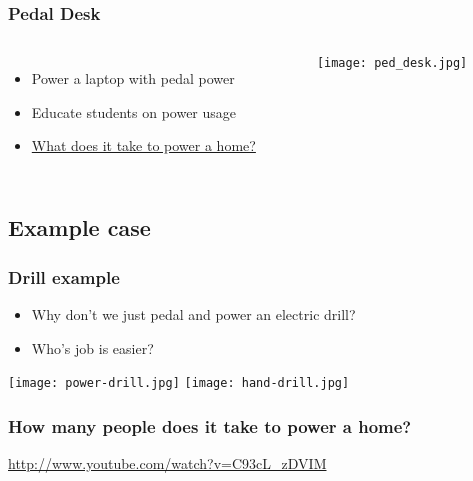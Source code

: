 \documentclass[]{beamer}
\begin{document}
\frame
{
    \frametitle{Pedal Desk}
    \begin{columns}[t]
        \column{6cm}
        \begin{itemize}
            \item Power a laptop with pedal power
            \item Educate students on power usage
            \item \href{http://news.bbc.co.uk/2/hi/science/nature/8394055.stm}{What does it take to power a home?}
        \end{itemize}
        \column{5cm}
        \begin{center}
        \begin{figure}[]
            \texttt{[image: ped\_desk.jpg]}
        \end{figure}
        \end{center}
    \end{columns}
}
\subsection{Example case}
\frame
{
    \frametitle{Drill example}
        \begin{itemize}[<+->]
            \item Why don't we just pedal and power an electric drill?
            \item Who's job is easier?
        \end{itemize}
        \begin{center}
            \texttt{[image: power-drill.jpg]}
            \texttt{[image: hand-drill.jpg]}
        \end{center}
}
\frame
{
    \frametitle{How many people does it take to power a home?}
    \url{http://www.youtube.com/watch?v=C93cL_zDVIM}
}
\end{document}
